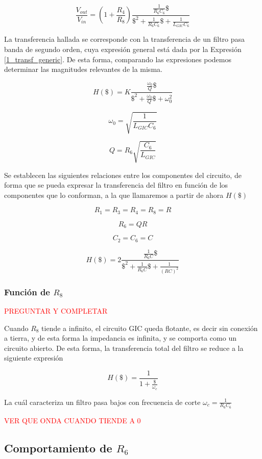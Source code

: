 \begin{equation}
\frac{V_{out}}{V_{in}} = \left(1+\frac{R_4}{R_8}\right) \frac{\frac{1}{R_6C_6}\$}{\$^2 + \frac{1}{R_6C_6}\$ + \frac{1}{L_{GIC}C_6}}
\label{1_transfer_completa}
\end{equation}

La transferencia hallada se corresponde con la transferencia de un filtro pasa banda de segundo orden, cuya expresión general está dada por la Expresión \ref{1_transf_generic}. De esta forma, comparando las expresiones podemos determinar las magnitudes relevantes de la misma.

\begin{equation}
H(\$) = K\frac{\frac{\omega_0}{Q}\$}{\$^2 + \frac{\omega_0}{Q}\$ + \omega_0^2}
\label{1_transf_generic}
\end{equation}

\[
\omega_0 = \sqrt{\frac{1}{L_{GIC}C_6}}
\]

\[
Q = R_6 \sqrt{\frac{C_6}{L_{GIC}}}
\]

Se establecen las siguientes relaciones entre los componentes del circuito, de forma que se pueda expresar la transferencia del filtro en función de los componentes que lo conforman, a la que llamaremos a partir de ahora $H(\$)$

\[
R_1 = R_3 = R_4 = R_8 = R
\]

\[
R_6 = QR
\]

\[
C_2 = C_6 = C
\]

\[
H(\$) = 2 \frac{\frac{1}{R_6C}\$}{\$^2 + \frac{1}{R_6C}\$ + \frac{1}{(RC)^2}}
\]

\subsubsection{Función de $R_8$}
\textcolor{red}{PREGUNTAR Y COMPLETAR}

Cuando $R_8$ tiende a infinito, el circuito GIC queda flotante, es decir sin conexión a tierra, y de esta forma la impedancia es infinita, y se comporta como un circuito abierto. De esta forma, la transferencia total del filtro se reduce a la siguiente expresión

\[
H(\$) = \frac{1}{1 + \frac{\$}{\omega_c}}
\]

La cuál caracteriza un filtro pasa bajos con frecuencia de corte $\omega_c = \frac{1}{R_6C_6}$

\textcolor{red}{VER QUE ONDA CUANDO TIENDE A 0}

\subsection{Comportamiento de $R_6$}\label{1_seccion_r6}

